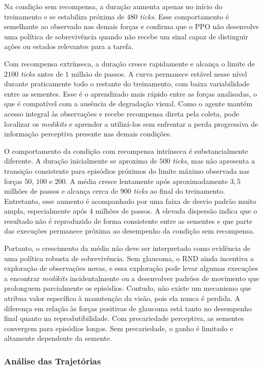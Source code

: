 Na condição sem recompensa, a duração aumenta apenas no início do treinamento e se estabiliza próxima de $480$ \textit{ticks}. Esse comportamento é semelhante ao observado nas demais forças e confirma que o PPO não desenvolve uma política de sobrevivência quando não recebe um sinal capaz de distinguir ações ou estados relevantes para a tarefa.

Com recompensa extrínseca, a duração cresce rapidamente e alcança o limite de $2100$ \textit{ticks} antes de $1$ milhão de passos. A curva permanece estável nesse nível durante praticamente todo o restante do treinamento, com baixa variabilidade entre as sementes. Esse é o aprendizado mais rápido entre as forças analisadas, o que é compatível com a ausência de degradação visual. Como o agente mantém acesso integral às observações e recebe recompensa direta pela coleta, pode localizar os \textit{medikits} e aprender a utilizá-los sem enfrentar a perda progressiva de informação perceptiva presente nas demais condições.

O comportamento da condição com recompensa intrínseca é substancialmente diferente. A duração inicialmente se aproxima de $500$ \textit{ticks}, mas não apresenta a transição consistente para episódios próximos do limite máximo observada nas forças $50$, $100$ e $200$. A média cresce lentamente após aproximadamente $3{,}5$ milhões de passos e alcança cerca de $900$ \textit{ticks} ao final do treinamento. Entretanto, esse aumento é acompanhado por uma faixa de desvio padrão muito ampla, especialmente após $4$ milhões de passos. A elevada dispersão indica que o resultado não é reproduzido de forma consistente entre as sementes e que parte das execuções permanece próxima ao desempenho da condição sem recompensa.

Portanto, o crescimento da média não deve ser interpretado como evidência de uma política robusta de sobrevivência. Sem glaucoma, o RND ainda incentiva a exploração de observações novas, e essa exploração pode levar algumas execuções a encontrar \textit{medikits} incidentalmente ou a desenvolver padrões de movimento que prolonguem parcialmente os episódios. Contudo, não existe um mecanismo que atribua valor específico à manutenção da visão, pois ela nunca é perdida. A diferença em relação às forças positivas de glaucoma está tanto no desempenho final quanto na reprodutibilidade. Com precariedade perceptiva, as sementes convergem para episódios longos. Sem precariedade, o ganho é limitado e altamente dependente da semente.

\subsubsection{Análise das Trajetórias}

